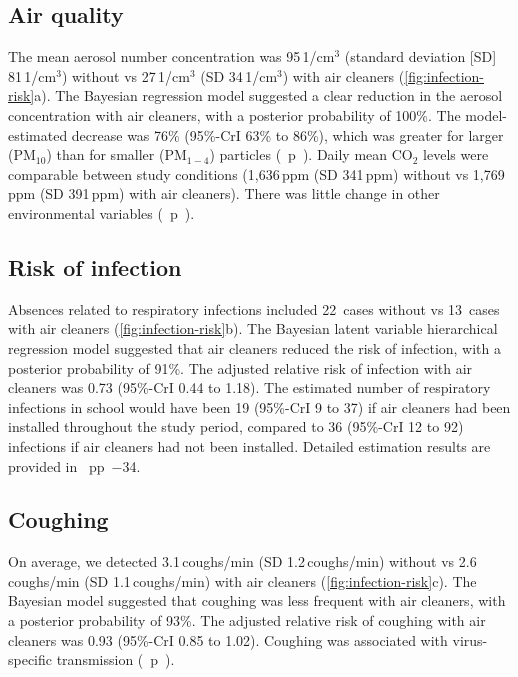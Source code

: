 \documentclass[fleqn,11pt]{wlscirep}
\begin{document}
\subsection*{Air quality}

The mean aerosol number concentration was 95\,1/cm$^3$ (standard deviation [SD] 81\,1/cm$^3$) without vs 27\,1/cm$^3$ (SD 34\,1/cm$^3$) with air cleaners (\cref{fig:infection-risk}a). The Bayesian regression model suggested a clear reduction in the aerosol concentration with air cleaners, with a posterior probability of 100\%. The model-estimated decrease was 76\% (95\%-CrI 63\% to 86\%), which was greater for larger (PM$_{10}$) than for smaller (PM$_{1-4}$) particles (\supp~p~). Daily mean CO$_2$ levels were comparable between study conditions (1,636\,ppm (SD 341\,ppm) without vs 1,769\,ppm (SD 391\,ppm) with air cleaners). There was little change in other environmental variables (\supp~p~). 

\subsection*{Risk of infection}

Absences related to respiratory infections included 22~cases without vs 13~cases with air cleaners (\cref{fig:infection-risk}b). The Bayesian latent variable hierarchical regression model suggested that air cleaners reduced the risk of infection, with a posterior probability of 91\%. The adjusted relative risk of infection with air cleaners was 0.73 (95\%-CrI 0.44 to 1.18). The estimated number of respiratory infections in school would have been 19 (95\%-CrI 9 to 37) if air cleaners had been installed throughout the study period, compared to 36 (95\%-CrI 12 to 92) infections if air cleaners had not been installed. Detailed estimation results are provided in \supp~pp~$-$34. 

\subsection*{Coughing}

On average, we detected 3.1\,coughs/min (SD 1.2\,coughs/min) without vs 2.6\,coughs/min (SD 1.1\,coughs/min) with air cleaners (\cref{fig:infection-risk}c). The Bayesian model suggested that coughing was less frequent with air cleaners, with a posterior probability of 93\%. The adjusted relative risk of coughing with air cleaners was 0.93 (95\%-CrI 0.85 to 1.02). Coughing was associated with virus-specific transmission (\supp~p~).
\end{document}
